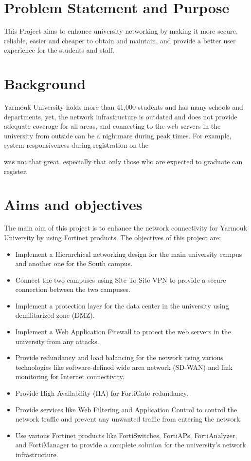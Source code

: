 \documentclass[12pt]{report}
\begin{document}
\section{Problem Statement and Purpose}
This Project aims to enhance university networking by making it more secure, 
reliable, easier and cheaper to obtain and maintain, and provide a better user experience for the students and staff.

\section{Background}
Yarmouk University holds more than 41,000 students \cite{YU} and has many schools and departments, yet, the network infrastructure is outdated and does not provide adequate coverage for all areas, and connecting to the web servers in the university from outside can be a nightmare during peak times. For example, system responsiveness during registration on the \date{19th of May, 2024} was not that great, especially that only those who are expected to graduate can register.
\section{Aims and objectives}
The main aim of this project is to enhance the network connectivity for Yarmouk University by using Fortinet products. The objectives of this project are:
\begin{itemize}
    \item Implement a Hierarchical networking design for the main university campus and another one for the South campus.
    \item Connect the two campuses using Site-To-Site VPN to provide a secure connection between the two campuses.
    \item Implement a protection layer for the data center in the university using demilitarized zone (DMZ).
    \item Implement a Web Application Firewall to protect the web servers in the university from any attacks.
    \item Provide redundancy and load balancing for the network using various technologies like software-defined wide area network (SD-WAN) and link monitoring for Internet connectivity.
    \item Provide High Availability (HA) for FortiGate redundancy.
    \item Provide services like Web Filtering and Application Control to control the network traffic and prevent any unwanted traffic from entering the network.
    \item Use various Fortinet products like FortiSwitches, FortiAPs, FortiAnalyzer, and FortiManager to provide a complete solution for the university's network infrastructure.
\end{itemize}
\end{document}
